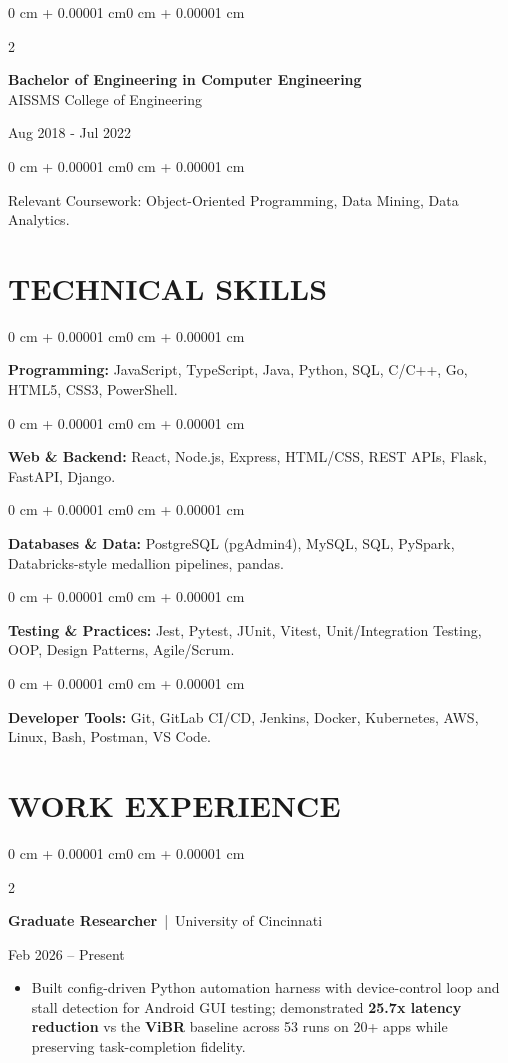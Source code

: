 \documentclass[10pt, letterpaper]{article}
\newenvironment{highlights}{
    \begin{itemize}[
        topsep=0.10 cm,
        parsep=0.06 cm,
        partopsep=0pt,
        itemsep=0.06 cm,
        leftmargin=12pt
    ]
}{
    \end{itemize}
}
\newenvironment{onecolentry}{
    \begin{adjustwidth}{0 cm + 0.00001 cm}{0 cm + 0.00001 cm}
}{
    \end{adjustwidth}
}
\newenvironment{twocolentry}[2][]{
    \onecolentry
    \def\secondColumn{#2}
    \setcolumnwidth{\fill, 4.5 cm}
    \begin{paracol}{2}
}{
    \switchcolumn \raggedleft \secondColumn
    \end{paracol}
    \endonecolentry
}
\begin{document}
\begin{twocolentry}{
    Aug 2018 - Jul 2022
}
    \textbf{Bachelor of Engineering in Computer Engineering} \\
    AISSMS College of Engineering
\end{twocolentry}
\begin{onecolentry}
Relevant Coursework: Object-Oriented Programming, Data Mining, Data Analytics.
\end{onecolentry}
\section{TECHNICAL SKILLS}
\begin{onecolentry}
\textbf{Programming:} JavaScript, TypeScript, Java, Python, SQL, C/C++, Go, HTML5, CSS3, PowerShell.
\end{onecolentry}
\vspace{0.06 cm}
\begin{onecolentry}
\textbf{Web \& Backend:} React, Node.js, Express, HTML/CSS, REST APIs, Flask, FastAPI, Django.
\end{onecolentry}
\vspace{0.06 cm}
\begin{onecolentry}
\textbf{Databases \& Data:} PostgreSQL (pgAdmin4), MySQL, SQL, PySpark, Databricks-style medallion pipelines, pandas.
\end{onecolentry}
\vspace{0.06 cm}
\begin{onecolentry}
\textbf{Testing \& Practices:} Jest, Pytest, JUnit, Vitest, Unit/Integration Testing, OOP, Design Patterns, Agile/Scrum.
\end{onecolentry}
\vspace{0.06 cm}
\begin{onecolentry}
\textbf{Developer Tools:} Git, GitLab CI/CD, Jenkins, Docker, Kubernetes, AWS, Linux, Bash, Postman, VS Code.
\end{onecolentry}

\section{WORK EXPERIENCE}
\begin{twocolentry}{Feb 2026 -- Present}
\textbf{Graduate Researcher} \,|\, University of Cincinnati
\end{twocolentry}
\begin{highlights}
  \item Built config-driven Python automation harness with device-control loop and stall detection for Android GUI testing; demonstrated \textbf{25.7x latency reduction} vs the \textbf{ViBR} baseline across 53 runs on 20+ apps while preserving task-completion fidelity.
\end{highlights}
\end{document}
